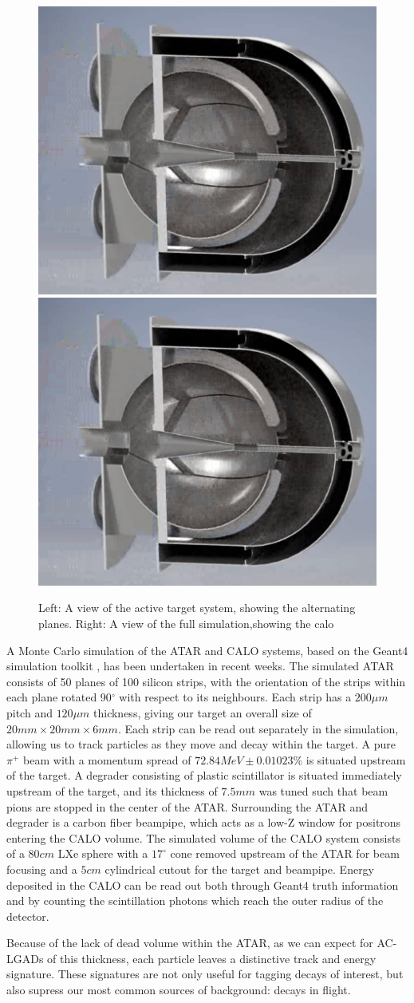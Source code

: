 \label{sec:simulation}

\begin{figure}[h!]
\centering
\includegraphics[width=.4\textwidth]{sections/figures/calo.Xe.png}
\includegraphics[width=.4\textwidth]{sections/figures/calo.Xe.png}
\caption{Left: A view of the active target system, showing the alternating planes. Right: A view of the full simulation,showing the calo }
\label{fig:simulation.view}
\end{figure}

A Monte Carlo simulation of the ATAR and CALO systems, based on the Geant4 simulation toolkit \cite{geant4}, has been undertaken in recent weeks. The simulated ATAR consists of 50 planes of 100 silicon strips, with the orientation of the strips within each plane rotated 90$^\circ$ with respect to its neighbours. Each strip has a $200 \mu m$ pitch and $120 \mu m$ thickness, giving our target an overall size of $20 mm \times 20 mm \times 6 mm$. Each strip can be read out separately in the simulation, allowing us to track particles as they move and decay within the target. A pure $\pi^{+}$ beam with a momentum spread of $72.84MeV \pm 0.01023$\% is situated upstream of the target. A degrader consisting of plastic scintillator is situated immediately upstream of the target, and its thickness of $7.5 mm$ was tuned such that beam pions are stopped in the center of the ATAR. Surrounding the ATAR and degrader is a carbon fiber beampipe, which acts as a low-Z window for positrons entering the CALO volume. The simulated volume of the CALO system consists of a $80 cm$ LXe sphere with a $17^{\circ}$ cone removed upstream of the ATAR for beam focusing and a $5 cm$ cylindrical cutout for the target and beampipe. Energy deposited in the CALO can be read out both through Geant4 truth information and by counting the scintillation photons which reach the outer radius of the detector.

Because of the lack of dead volume within the ATAR, as we can expect for AC-LGADs of this thickness, each particle leaves a distinctive track and energy signature. These signatures are not only useful for tagging decays of interest, but also supress our most common sources of background: decays in flight.